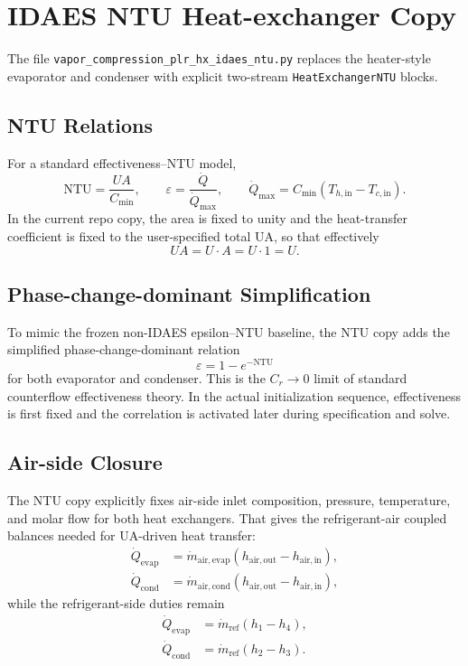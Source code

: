\documentclass[11pt]{article}
\begin{document}
\section{IDAES NTU Heat-exchanger Copy}
The file \texttt{vapor\_compression\_plr\_hx\_idaes\_ntu.py} replaces the heater-style evaporator and condenser with explicit two-stream \texttt{HeatExchangerNTU} blocks.

\subsection{NTU Relations}
For a standard effectiveness--NTU model,
\begin{equation}
\mathrm{NTU} = \frac{UA}{C_{\min}},
\qquad
\varepsilon = \frac{\dot{Q}}{\dot{Q}_{\max}},
\qquad
\dot{Q}_{\max} = C_{\min}(T_{h,\mathrm{in}} - T_{c,\mathrm{in}}).
\end{equation}
In the current repo copy, the area is fixed to unity and the heat-transfer coefficient is fixed to the user-specified total UA, so that effectively
\begin{equation}
UA = U \cdot A = U \cdot 1 = U.
\end{equation}

\subsection{Phase-change-dominant Simplification}
To mimic the frozen non-IDAES epsilon--NTU baseline, the NTU copy adds the simplified phase-change-dominant relation
\begin{equation}
\varepsilon = 1 - e^{-\mathrm{NTU}}
\end{equation}
for both evaporator and condenser. This is the $C_r \to 0$ limit of standard counterflow effectiveness theory. In the actual initialization sequence, effectiveness is first fixed and the correlation is activated later during specification and solve.

\subsection{Air-side Closure}
The NTU copy explicitly fixes air-side inlet composition, pressure, temperature, and molar flow for both heat exchangers. That gives the refrigerant-air coupled balances needed for UA-driven heat transfer:
\begin{align}
\dot{Q}_{\mathrm{evap}} &= \dot{m}_{\mathrm{air,evap}}(h_{\mathrm{air,out}} - h_{\mathrm{air,in}}), \\
\dot{Q}_{\mathrm{cond}} &= \dot{m}_{\mathrm{air,cond}}(h_{\mathrm{air,out}} - h_{\mathrm{air,in}}),
\end{align}
while the refrigerant-side duties remain
\begin{align}
\dot{Q}_{\mathrm{evap}} &= \dot{m}_{\mathrm{ref}}(h_1-h_4), \\
\dot{Q}_{\mathrm{cond}} &= \dot{m}_{\mathrm{ref}}(h_2-h_3).
\end{align}
\end{document}
